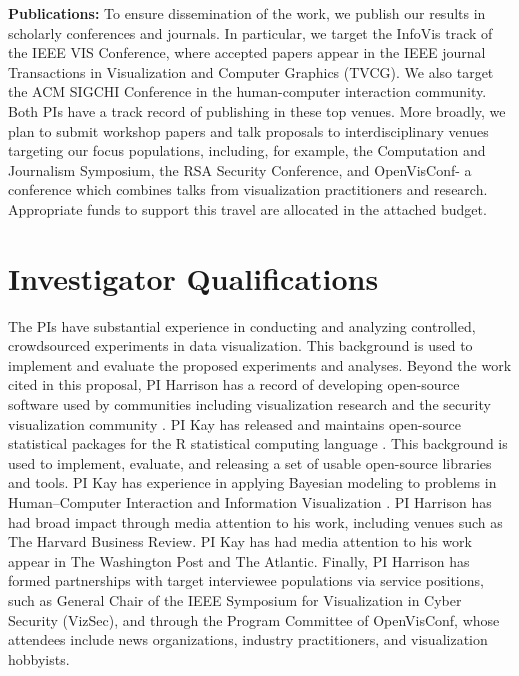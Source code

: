 \documentclass[11pt]{article}
\begin{document}
\noindent\textbf{Publications:}
To ensure dissemination of the work, we publish our results in scholarly conferences and journals.
In particular, we target the InfoVis track of the IEEE VIS Conference, where accepted papers appear in the IEEE journal Transactions in Visualization and Computer Graphics (TVCG).
We also target the ACM SIGCHI Conference in the human-computer interaction community.
Both PIs have a track record of publishing in these top venues.
More broadly, we plan to submit workshop papers and talk proposals to interdisciplinary venues targeting our focus populations, including, for example, the Computation and Journalism Symposium, the RSA Security Conference, and OpenVisConf- a conference which combines talks from visualization practitioners and research.
Appropriate funds to support this travel are allocated in the attached budget.

\section{Investigator Qualifications}
The PIs have substantial experience in conducting and analyzing controlled, crowdsourced experiments in data visualization.
This background is used to implement and evaluate the proposed experiments and analyses.
Beyond the work cited in this proposal, PI Harrison has a record of developing open-source software used by communities including visualization research \cite{experimentr} and the security visualization community \cite{nv}. 
PI Kay has released and maintains open-source statistical packages for the R statistical computing language \cite{kay2016artool, kay2017tidybayes}.
This background is used to implement, evaluate, and releasing a set of usable open-source libraries and tools.
PI Kay has experience in applying Bayesian modeling to problems in Human--Computer Interaction \cite{kay2016bayes} and Information Visualization \cite{kay2016beyond, kay2016bus}.
PI Harrison has had broad impact through media attention to his work, including venues such as The Harvard Business Review. 
PI Kay has had media attention to his work appear in The Washington Post and The Atlantic.
Finally, PI Harrison has formed partnerships with target interviewee populations via service positions, such as General Chair of the IEEE Symposium for Visualization in Cyber Security (VizSec), and through the Program Committee of OpenVisConf, whose attendees include news organizations, industry practitioners, and visualization hobbyists.
\end{document}
